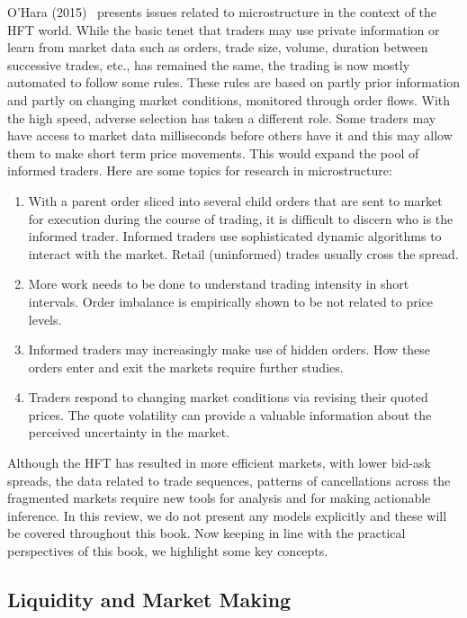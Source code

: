 O'Hara (2015)~\cite{ohara15hfmm} presents issues related to microstructure in the context of the HFT world. While the basic tenet that traders may use private information or learn from market data such as orders, trade size, volume, duration between successive trades, etc., has remained the same, the trading is now mostly automated to follow some rules. These rules are based on partly prior information and partly on changing market conditions, monitored through order flows. With the high speed, adverse selection has taken a different role. Some traders may have access to market data milliseconds before others have it and this may allow them to make short term price movements. This would expand the pool of informed traders. Here are some topics for research in microstructure:


\begin{enumerate}[--]
\item With a parent order sliced into several child orders that are sent to market for execution during the course of trading, it is difficult to discern who is the informed trader. Informed traders use sophisticated dynamic algorithms to interact with the market. Retail (uninformed) trades usually cross the spread.

\item More work needs to be done to understand trading intensity in short intervals. Order imbalance is empirically shown to be not related to price levels. 

\item Informed traders may increasingly make use of hidden orders. How these orders enter and exit the markets require further studies. 

\item Traders respond to changing market conditions via revising their quoted prices. The quote volatility can provide a valuable information about the perceived uncertainty in the market.
\end{enumerate}


Although the HFT has resulted in more efficient markets, with lower bid-ask spreads, the data related to trade sequences, patterns of cancellations across the fragmented markets require new tools for analysis and for making actionable inference. In this review, we do not present any models explicitly and these will be covered throughout this book. Now keeping in line with the practical perspectives of this book, we highlight some key concepts.


\subsection{Liquidity and Market Making}

